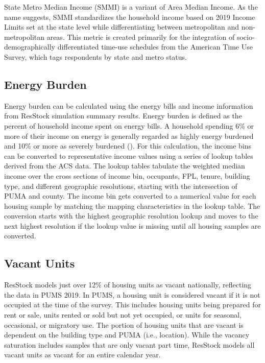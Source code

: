 State Metro Median Income (SMMI) is a variant of Area Median Income. As the name suggests, SMMI standardizes the household income based on 2019 Income Limits set at the state level while differentiating between metropolitan and non-metropolitan areas. This metric is created primarily for the integration of socio-demographically differentiated time-use schedules from the American Time Use Survey, which tags respondents by state and metro status.

\subsection{Energy Burden}\label{resstock_input_energy_burden}
Energy burden can be calculated using the energy bills and income information from ResStock simulation summary results. Energy burden is defined as the percent of household income spent on energy bills. A household spending 6\% or more of their income on energy is generally regarded as highly energy burdened and 10\% or more as severely burdened (\cite{drehobl2020_energy_burden}).  For this calculation, the income bins can be converted to representative income values using a series of lookup tables derived from the ACS data. The lookup tables tabulate the weighted median income over the cross sections of income bin, occupants, FPL, tenure, building type, and different geographic resolutions, starting with the intersection of PUMA and county. The income bin gets converted to a numerical value for each housing sample by matching the mapping characteristics in the lookup table. The conversion starts with the highest geographic resolution lookup and moves to the next highest resolution if the lookup value is missing until all housing samples are converted.

\subsection{Vacant Units}\label{vacant_units}
ResStock models just over 12\% of housing units as vacant nationally, reflecting the data in PUMS 2019. In PUMS, a housing unit is considered vacant if it is not occupied at the time of the survey. This includes housing units being prepared for rent or sale, units rented or sold but not yet occupied, or units for seasonal, occasional, or migratory use. The portion of housing units that are vacant is dependent on the building type and PUMA (i.e., location). While the vacancy saturation includes samples that are only vacant part time, ResStock models all vacant units as vacant for an entire calendar year. 

